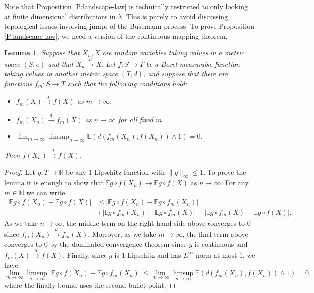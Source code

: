 \documentclass[11pt]{article}
\newcommand{\N}{\mathbb{N}}
\newcommand{\R}{\mathbb{R}}
\newcommand{\E}{\mathbb{E}}
\newcommand{\la}{\lambda}
\newcommand{\cvgd}{\stackrel{d}{\to}}
\newtheorem{lemma}[theorem]{Lemma}
\theoremstyle{definition} %
\theoremstyle{remark} %
\begin{document}
Note that Proposition \ref{P:landscape-law} is technically restricted to only looking at finite dimensional distributions in $\la$. This is purely to avoid discussing topological issues involving jumps of the Busemann process. To prove Proposition \ref{P:landscape-law}, we need a version of the continuous mapping theorem.

\begin{lemma}
\label{L:cty-theorem}
Suppose that $X_n, X$ are random variables taking values in a metric space $(S, e)$ and that $X_n \cvgd X$. Let $f:S \to T$ be a Borel-measurable function taking values in another metric space $(T, d)$, and suppose that there are functions $f_m:S \to T$ such that the following conditions hold:
\begin{itemize}
	\item $f_m(X) \cvgd f(X)$ as $m \to \infty$.
	\item $f_m(X_n) \cvgd f_m(X)$ as $n \to \infty$ for all fixed $m$.
	\item $\lim_{m \to \infty} \limsup_{n \to \infty} \E(d(f_m(X_n), f(X_n)) \wedge 1) = 0$.
\end{itemize}
Then $f(X_n) \cvgd f(X)$.
\end{lemma}

\begin{proof}
Let $g:T \to \R$ be any $1$-Lipschitz function with $\|g\|_\infty \le 1$. To prove the lemma it is enough to show that $\E g \circ f(X_n) \to \E g\circ f(X)$ as $n \to \infty$. For any $m \in \N$ we can write
\begin{align*}
|\E g \circ f(X_n) - \E g\circ f(X)| &\le |\E g \circ f(X_n) - \E g\circ f_m(X_n)| \\
&+ |\E g \circ f_m(X_n) - \E g\circ f_m(X)| + |\E g \circ f_m(X) - \E g\circ f(X)|.
\end{align*}
As we take $n \to \infty$, the middle term on the right-hand side above converges to $0$ since $f_m(X_n) \cvgd f_m(X)$. Moreover, as we take $m \to \infty$, the final term above converges to $0$ by the dominated convergence theorem since $g$ is continuous and $f_m(X) \cvgd f(X)$. Finally, since $g$ is $1$-Lipschitz and has $L^\infty$-norm at most $1$, we have:
$$
\lim_{m \to \infty} \limsup_{n \to \infty} |\E g \circ f(X_n) - \E g\circ f_m(X_n)| \le \lim_{m \to \infty} \limsup_{n \to \infty} \E(d(f_m(X_n), f(X_n)) \wedge 1) = 0,
$$
where the finally bound uses the second bullet point.
\end{proof}
\end{document}
